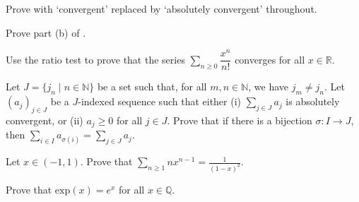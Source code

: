 \begin{exercise}
Prove  with `convergent' replaced by `absolutely convergent' throughout.
\end{exercise}


\begin{exercise}
Prove part (b) of .
\end{exercise}


\begin{exercise}
\label{exExponentialFunctionCoverges}
Use the ratio test to prove that the series $\sum_{n \ge 0} \dfrac{x^n}{n!}$ converges for all $x \in \mathbb{R}$.
\end{exercise}


\begin{exercise}
Let $J = \{ j_n \mid n \in \mathbb{N} \}$ be a set such that, for all $m,n \in \mathbb{N}$, we have $j_m \ne j_n$. Let $(a_j)_{j \in J}$ be a $J$-indexed sequence such that either (i) $\sum_{j \in J} a_j$ is absolutely convergent, or (ii) $a_j \ge 0$ for all $j \in J$. Prove that if there is a bijection $\sigma : I \to J$, then $\sum_{i \in I} a_{\sigma(i)} = \sum_{j \in J} a_j$.
\end{exercise}


\begin{exercise}
Let $x \in (-1,1)$. Prove that $\displaystyle \sum_{n \ge 1} nx^{n-1} = \frac{1}{(1-x)^2}$.
\end{exercise}



\begin{exercise}
Prove that $\mathrm{exp}(x) = e^x$ for all $x \in \mathbb{Q}$.
\end{exercise}

